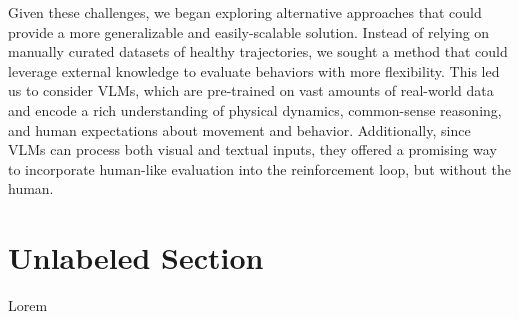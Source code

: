 \documentclass{article}
\begin{document}
Given these challenges, we began exploring alternative approaches that could provide a more generalizable and easily-scalable solution. Instead of relying on manually curated datasets of healthy trajectories, we sought a method that could leverage external knowledge to evaluate behaviors with more flexibility. This led us to consider VLMs, which are pre-trained on vast amounts of real-world data and encode a rich understanding of physical dynamics, common-sense reasoning, and human expectations about movement and behavior. Additionally, since VLMs can process both visual and textual inputs, they offered a promising way to incorporate human-like evaluation into the reinforcement loop, but without the human.


\section*{Unlabeled Section}
Lorem


 
\end{document}
